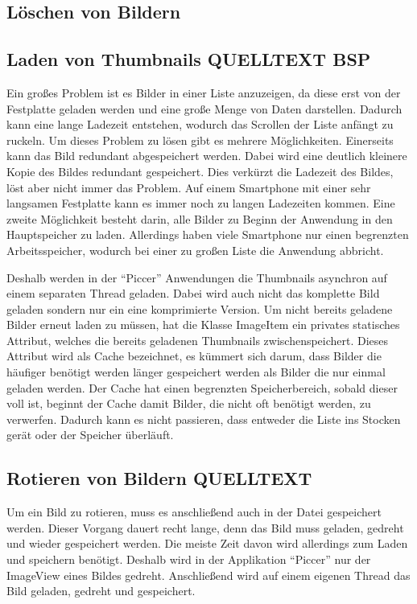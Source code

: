 \subsection{Löschen von Bildern}
\subsection{Laden von Thumbnails QUELLTEXT BSP}
Ein großes Problem ist es Bilder in einer Liste anzuzeigen,
da diese erst von der Festplatte geladen werden und eine große Menge von Daten darstellen.
Dadurch kann eine lange Ladezeit entstehen,
wodurch das Scrollen der Liste anfängt zu ruckeln.
Um dieses Problem zu lösen gibt es mehrere Möglichkeiten.
Einerseits kann das Bild redundant abgespeichert werden.
Dabei wird eine deutlich kleinere Kopie des Bildes redundant gespeichert.
Dies verkürzt die Ladezeit des Bildes, löst aber nicht immer das Problem.
Auf einem Smartphone mit einer sehr langsamen Festplatte kann es immer noch zu langen Ladezeiten kommen.
Eine zweite Möglichkeit besteht darin, alle Bilder zu Beginn der Anwendung in den Hauptspeicher zu laden.
Allerdings haben viele Smartphone nur einen begrenzten Arbeitsspeicher, wodurch bei einer 
zu großen Liste die Anwendung abbricht.

Deshalb werden in der \enquote{Piccer} Anwendungen die Thumbnails asynchron auf einem separaten Thread geladen.
Dabei wird auch nicht das komplette Bild geladen sondern nur ein eine komprimierte Version.
Um nicht bereits geladene Bilder erneut laden zu müssen,
hat die Klasse ImageItem ein privates statisches Attribut, welches die bereits geladenen Thumbnails zwischenspeichert.
Dieses Attribut wird als Cache bezeichnet, es kümmert sich darum, dass Bilder die häufiger 
benötigt werden länger gespeichert werden als Bilder die nur einmal geladen werden.
Der Cache hat einen begrenzten Speicherbereich, sobald dieser voll ist, beginnt der Cache
damit Bilder, die nicht oft benötigt werden, zu verwerfen.
Dadurch kann es nicht passieren, dass entweder die Liste ins Stocken gerät oder der Speicher überläuft.

\subsection{Rotieren von Bildern QUELLTEXT}
Um ein Bild zu rotieren, muss es anschließend auch in der Datei gespeichert werden.
Dieser Vorgang dauert recht lange, denn das Bild muss geladen, gedreht und wieder gespeichert werden.
Die meiste Zeit davon wird allerdings zum Laden und speichern benötigt.
Deshalb wird in der Applikation \enquote{Piccer} nur der ImageView eines Bildes gedreht.
Anschließend wird auf einem eigenen Thread das Bild geladen, gedreht und gespeichert.


